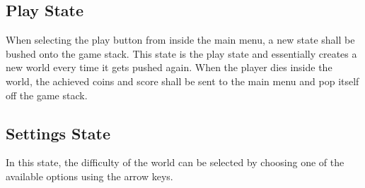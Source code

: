 \documentclass{report}
\begin{document}
\subsection{Play State}
When selecting the play button from inside the main menu, a new state shall be bushed onto the game stack. This state is the play state and essentially creates a new world every time it gets pushed again. When the player dies inside the world, the achieved coins and score shall be sent to the main menu and pop itself off the game stack.

\subsection{Settings State}
In this state, the difficulty of the world can be selected by choosing one of the available options using the arrow keys.

\begin{figure}[!tbp]
  \centering
  \hfill
\end{figure}
\end{document}
